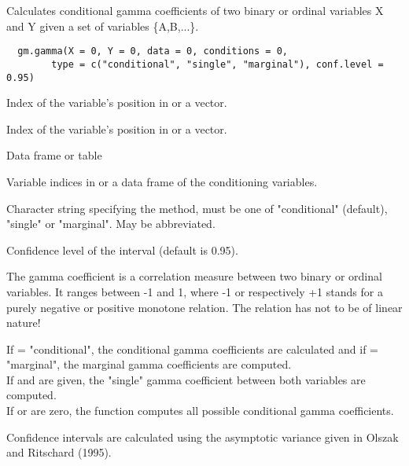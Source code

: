 \begin{Description}\relax
Calculates conditional gamma coefficients of two binary or ordinal variables X and Y given a 
set of variables \{A,B,...\}.
\end{Description}
\begin{Usage}
\begin{verbatim}
  gm.gamma(X = 0, Y = 0, data = 0, conditions = 0,
        type = c("conditional", "single", "marginal"), conf.level = 0.95)
\end{verbatim}
\end{Usage}
\begin{Arguments}
\begin{ldescription}
\item[\code{X}] Index of the variable's position in  or a vector. 
\item[\code{Y}] Index of the variable's position in  or a vector. 
\item[\code{data}] Data frame or table 
\item[\code{conditions}] Variable indices in  or a data frame of the conditioning variables. 
\item[\code{type}] Character string specifying the method,
must be one of "conditional" (default), "single" or "marginal". 
May be abbreviated. 
\item[\code{conf.level}] Confidence level of the interval (default is 0.95). 
\end{ldescription}
\end{Arguments}
\begin{Details}\relax
The gamma coefficient is a correlation measure between two
binary or ordinal variables. It ranges between -1 and 1, where -1 or respectively
+1 stands for a purely negative or positive monotone relation. The relation has
not to be of linear nature!

If  = "conditional", the conditional gamma coefficients are calculated and
if  = "marginal", the marginal gamma coefficients are computed. \\
If  and  are given, the "single" gamma coefficient between both
variables are computed.\\
If  or  are zero, the function computes all possible conditional gamma coefficients.

Confidence intervals are calculated using the asymptotic variance given in Olszak and Ritschard (1995).
\end{Details}
